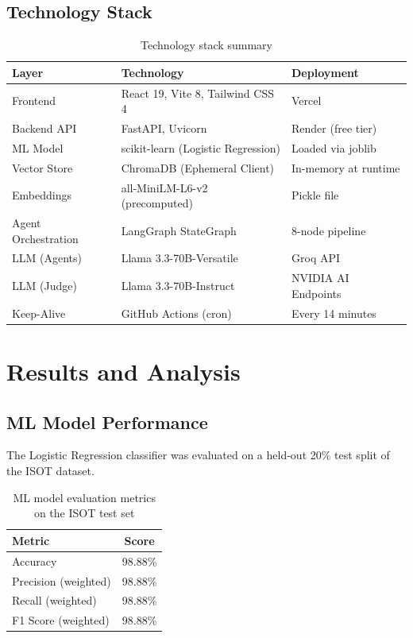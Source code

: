 \documentclass[12pt, a4paper]{article}
\begin{document}
\subsection{Technology Stack}

\begin{table}[H]
\centering
\caption{Technology stack summary}
\label{tab:stack}
\begin{tabular}{@{}lll@{}}
\toprule
\textbf{Layer}    & \textbf{Technology}                  & \textbf{Deployment} \\
\midrule
Frontend          & React 19, Vite 8, Tailwind CSS 4     & Vercel \\
Backend API       & FastAPI, Uvicorn                      & Render (free tier) \\
ML Model          & scikit-learn (Logistic Regression)    & Loaded via joblib \\
Vector Store      & ChromaDB (Ephemeral Client)           & In-memory at runtime \\
Embeddings        & all-MiniLM-L6-v2 (precomputed)       & Pickle file \\
Agent Orchestration & LangGraph StateGraph                & 8-node pipeline \\
LLM (Agents)      & Llama 3.3-70B-Versatile              & Groq API \\
LLM (Judge)       & Llama 3.3-70B-Instruct               & NVIDIA AI Endpoints \\
Keep-Alive        & GitHub Actions (cron)                 & Every 14 minutes \\
\bottomrule
\end{tabular}
\end{table}

\section{Results and Analysis}

\subsection{ML Model Performance}

The Logistic Regression classifier was evaluated on a held-out 20\% test
split of the ISOT dataset.

\begin{table}[H]
\centering
\caption{ML model evaluation metrics on the ISOT test set}
\label{tab:ml-metrics}
\begin{tabular}{@{}lc@{}}
\toprule
\textbf{Metric}              & \textbf{Score} \\
\midrule
Accuracy                     & 98.88\% \\
Precision (weighted)         & 98.88\% \\
Recall (weighted)            & 98.88\% \\
F1 Score (weighted)          & 98.88\% \\
\bottomrule
\end{tabular}
\end{table}
\end{document}

